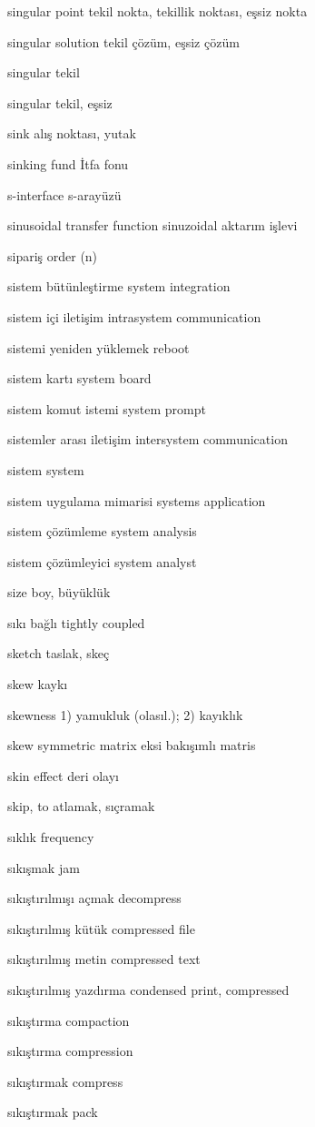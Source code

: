 \documentclass[12pt,fleqn]{article}\usepackage{../../common}
\begin{document}
singular point tekil nokta, tekillik noktası,  eşsiz nokta

singular solution tekil çözüm, eşsiz çözüm

singular tekil

singular tekil, eşsiz

sink alış noktası, yutak

sinking fund İtfa fonu

s-interface s-arayüzü

sinusoidal transfer function sinuzoidal aktarım işlevi

sipariş order (n)

sistem bütünleştirme system integration

sistem içi iletişim intrasystem communication

sistemi yeniden yüklemek reboot

sistem kartı system board

sistem komut istemi system prompt

sistemler arası iletişim intersystem communication

sistem system

sistem uygulama mimarisi systems application

sistem çözümleme system analysis

sistem çözümleyici system analyst

size boy, büyüklük

sıkı bağlı tightly coupled

sketch taslak, skeç

skew kaykı

skewness 1) yamukluk (olasıl.); 2) kayıklık

skew symmetric matrix eksi bakışımlı matris

skin effect deri olayı

skip, to atlamak, sıçramak

sıklık frequency

sıkışmak jam

sıkıştırılmışı açmak decompress

sıkıştırılmış kütük compressed file

sıkıştırılmış metin compressed text

sıkıştırılmış yazdırma condensed print, compressed

sıkıştırma compaction

sıkıştırma compression

sıkıştırmak compress

sıkıştırmak pack
\end{document}
